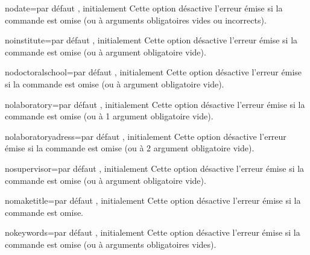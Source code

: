 \begin{description}
\begin{docKey}{nodate}{=\textbar{}}{par défaut
      , initialement }
    Cette option désactive l'erreur émise si la commande  est
    omise (ou à arguments obligatoires vides ou incorrects).
  \end{docKey}
  \begin{docKey}{noinstitute}{=\textbar{}}{par
      défaut , initialement }
    Cette option désactive l'erreur émise si la commande  est
    omise (ou à argument obligatoire vide).
  \end{docKey}
  \begin{docKey}{nodoctoralschool}{=\textbar{}}{par
      défaut , initialement }
    Cette option désactive l'erreur émise si la commande
     est omise (ou à argument obligatoire vide).
  \end{docKey}
  \begin{docKey}{nolaboratory}{=\textbar{}}{par
      défaut , initialement }
    Cette option désactive l'erreur émise si la commande 
    est omise (ou à 1\ier{} argument obligatoire vide).
  \end{docKey}
  \begin{docKey}{nolaboratoryadress}{=\textbar{}}{par
      défaut , initialement }
    Cette option désactive l'erreur émise si la commande 
    est omise (ou à 2\ieme{} argument obligatoire vide).
  \end{docKey}
  \begin{docKey}{nosupervisor}{=\textbar{}}{par
      défaut , initialement }
    Cette option désactive l'erreur émise si la commande 
    est omise (ou à argument obligatoire vide).
  \end{docKey}
  \begin{docKey}{nomaketitle}{=\textbar{}}{par
      défaut , initialement }
    Cette option désactive l'erreur émise si la commande  est
    omise.
  \end{docKey}
  \begin{docKey}{nokeywords}{=\textbar{}}{par
      défaut , initialement }
    Cette option désactive l'erreur émise si la commande  est
    omise (ou à arguments obligatoires vides).

\end{docKey}
\end{description}
